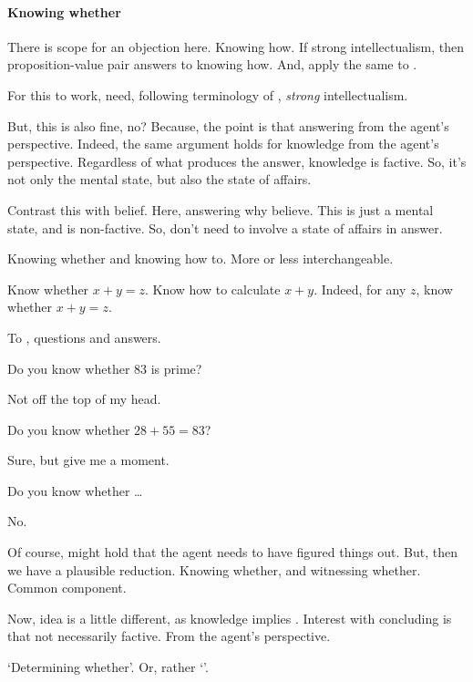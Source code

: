 \paragraph{Knowing whether}

\begin{note}
  \color{red}
  There is scope for an objection here.
  Knowing how.
  If strong intellectualism, then proposition-value pair answers to knowing how.
  And, apply the same to \qzS{}.

  For this to work, need, following terminology of \textcite{Glick:2011vd}, \emph{strong} intellectualism.

  But, this is also fine, no?
  Because, the point is that answering from the agent's perspective.
  Indeed, the same argument holds for knowledge from the agent's perspective.
  Regardless of what produces the answer, knowledge is factive.
  So, it's not only the mental state, but also the state of affairs.

  Contrast this with belief.
  Here, answering why believe.
  This is just a mental state, and is non-factive.
  So, don't need to involve a state of affairs in answer.
\end{note}

\begin{note}
  Knowing whether and knowing how to.
  More or less interchangeable.

  Know whether \(x + y = z\).
  Know how to calculate \(x + y\).
  Indeed, for any \(z\), know whether \(x + y = z\).
\end{note}

\begin{note}
  To , questions and answers.

  Do you know whether \(83\) is prime?

  Not off the top of my head.

  Do you know whether \(28 + 55 = 83\)?

  Sure, but give me a moment.

  Do you know whether \dots

  No.

  Of course, might hold that the agent needs to have figured things out.
  But, then we have a plausible reduction.
  Knowing whether, and witnessing whether.
  Common component.

  Now, idea is a little different, as knowledge implies \factivity{}.
  Interest with concluding is that not necessarily factive.
  From the agent's perspective.

  `Determining whether'.
  Or, rather `'.
\end{note}

